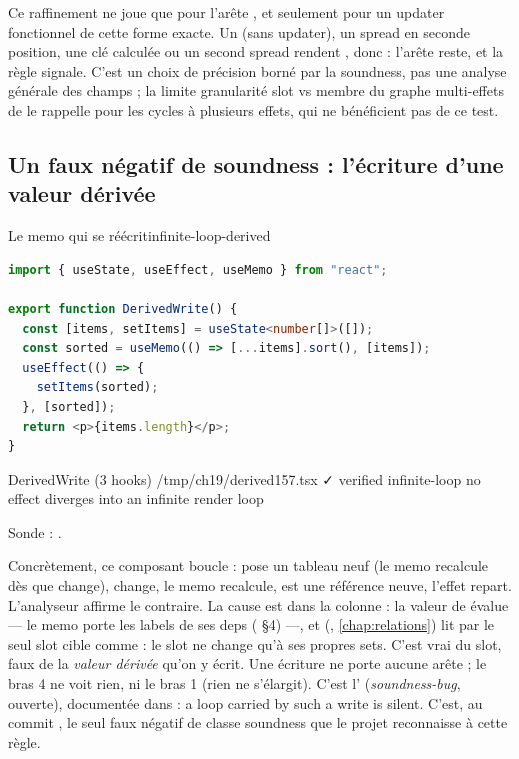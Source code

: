 \begin{piege}
Ce raffinement ne joue que pour l'arête , et seulement pour un updater fonctionnel de cette forme exacte. Un  (sans updater), un spread en seconde position, une clé calculée ou un second spread rendent , donc  : l'arête reste, et la règle signale. C'est un choix de précision borné par la soundness, pas une analyse générale des champs ; la limite \og granularité slot vs membre du graphe multi-effets\fg{} de  le rappelle pour les cycles à plusieurs effets, qui ne bénéficient pas de ce test.
\end{piege}

\subsection{Un faux négatif de soundness : l'écriture d'une valeur dérivée}

\begin{exemple}{Le memo qui se réécrit}{infinite-loop-derived}
\begin{lstlisting}[language=TypeScript,caption={\file{/tmp/ch19/derived157.tsx}},label={lst:infinite-loop-derived}]
import { useState, useEffect, useMemo } from "react";

export function DerivedWrite() {
  const [items, setItems] = useState<number[]>([]);
  const sorted = useMemo(() => [...items].sort(), [items]);
  useEffect(() => {
    setItems(sorted);
  }, [sorted]);
  return <p>{items.length}</p>;
}
\end{lstlisting}
\begin{sortie}
  DerivedWrite  (3 hooks)  /tmp/ch19/derived157.tsx  ✓
    verified  infinite-loop  no effect diverges into an infinite render loop
\end{sortie}
Sonde : .
\end{exemple}

Concrètement, ce composant boucle :  pose un tableau neuf (le memo recalcule  dès que  change),  change, le memo recalcule,  est une référence neuve, l'effet repart. L'analyseur affirme le contraire. La cause est dans la colonne  : la valeur de  évalue  --- le memo porte les labels de ses deps ( §4) ---, et  (, \cref{chap:relations}) lit \og {} par le seul slot cible\fg{} comme  : \og le slot ne change qu'à ses propres sets\fg. C'est vrai du slot, faux de la \emph{valeur dérivée} qu'on y écrit. Une écriture  ne porte aucune arête ; le bras 4 ne voit rien, ni le bras 1 (rien ne s'élargit). C'est l' (\emph{soundness-bug}, ouverte), documentée dans  : \og a loop carried by such a write is silent\fg. C'est, au commit \snapshotCommit, le seul faux négatif de classe soundness que le projet reconnaisse à cette règle.

